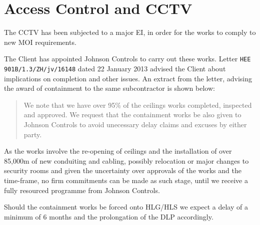 \chapter{Access Control and CCTV}

The CCTV has been subjected to a major EI, in order for the
works to comply to new MOI requirements.

The Client has appointed Johnson Controls to carry out these works.
Letter \texttt{HEE 901B/1.3/ZH/jv/16148} dated 22 January 2013 advised the Client about implications on completion and other issues. An extract from the letter, advising the award of containment to the same subcontractor is shown below:

\begin{quotation}
We note that we have over 95\% of the ceilings works completed, inspected and approved. We request that the containment works  be also given to Johnson Controls to avoid unecessary delay claims and excuses by either party.
\end{quotation}

As the works involve the re-opening of ceilings and the installation of over 85,000\si{\meter} of new conduiting and cabling, possibly relocation or major changes to security rooms and given the uncertainty over approvals of the works and the time-frame, no firm commitments can be made as such stage, until  we receive a fully resourced programme from Johnson Controls.

Should the containment works be forced onto HLG/HLS we expect a delay of a minimum of 6 months and the prolongation of the DLP accordingly.